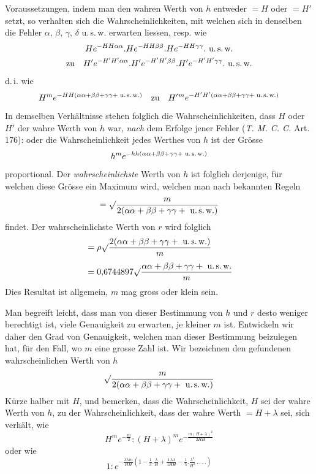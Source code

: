 Voraussetzungen, indem man den wahren Werth von \(h\) entweder \(=H\) oder \(=H'\) setzt, so verhalten sich die Wahrscheinlichkeiten, mit welchen sich in denselben die Fehler \(\alpha,\,\beta,\,\gamma,\,\delta\) u.\,s.\,w. erwarten liessen, resp. wie
\[
\begin{gathered}
He^{-HH\alpha\alpha}.He^{-HH\beta\beta}.He^{-HH\gamma\gamma}.\text{ u.\,s.\,w.}\\
\text{zu}\quad H'e^{-H'H'\alpha\alpha}.H'e^{-H'H'\beta\beta}.H'e^{-H'H'\gamma\gamma}.\text{ u.\,s.\,w.}
\end{gathered}
\]
d.\,i. wie
\[
H^m e^{-HH(\alpha\alpha+\beta\beta+\gamma\gamma+\text{ u.\,s.\,w.})}\quad\text{zu}\quad
H'{}^m e^{-H'H'(\alpha\alpha+\beta\beta+\gamma\gamma+\text{ u.\,s.\,w.})}
\]
In demselben Verhältnisse stehen folglich die Wahrscheinlichkeiten, dass \(H\) oder \(H'\) der wahre Werth von \(h\) war, \textit{nach} dem Erfolge jener Fehler (\textit{T. M. C. C.} Art. 176): oder die Wahrscheinlichkeit jedes Werthes von \(h\) ist der Grösse
\[
h^m e^{-hh(\alpha\alpha+\beta\beta+\gamma\gamma+\text{ u.\,s.\,w.})}
\]
proportional. Der \textit{wahrscheinlichste} Werth von \(h\) ist folglich derjenige, für welchen diese Grösse ein Maximum wird, welchen man nach bekannten Regeln
\[
=\surd\frac{m}{2(\alpha\alpha+\beta\beta+\gamma\gamma+\text{ u.\,s.\,w.})}
\]
findet. Der wahrscheinlichste Werth von \(r\) wird folglich
\[
\begin{aligned}
&=\rho\surd\frac{2(\alpha\alpha+\beta\beta+\gamma\gamma+\text{ u.\,s.\,w.})}{m}\\[4pt]
&=0{,}6744897\surd\frac{\alpha\alpha+\beta\beta+\gamma\gamma+\text{ u.\,s.\,w.}}{m}
\end{aligned}
\]
Dies Resultat ist allgemein, \(m\) mag gross oder klein sein.

Man begreift leicht, dass man von dieser Bestimmung von \(h\) und \(r\) desto weniger berechtigt ist, viele Genauigkeit zu erwarten, je kleiner \(m\) ist. Entwickeln wir daher den Grad von Genauigkeit, welchen man dieser Bestimmung beizulegen hat, für den Fall, wo \(m\) eine grosse Zahl ist. Wir bezeichnen den gefundenen wahrscheinlichen Werth von \(h\)
\[
\surd\frac{m}{2(\alpha\alpha+\beta\beta+\gamma\gamma+\text{ u.\,s.\,w.})}
\]
Kürze halber mit \(H\), und bemerken, dass die Wahrscheinlichkeit, \(H\) sei der
wahre Werth von \(h\), zu der Wahrscheinlichkeit, dass der wahre Werth \(=H+\lambda\) sei, sich verhält, wie
\[
H^m e^{-\frac m2}:(H+\lambda)^m e^{-\frac{m(H+\lambda)^2}{2HH}}
\]
oder wie
\[
1:e^{-\frac{\lambda\lambda m}{HH}(1-\frac13.\frac\lambda H+\frac{1\,\lambda\lambda}{4HH}-\frac15.\frac{\lambda^3}{H^3}\, .\,.\,.\,.)}
\]

